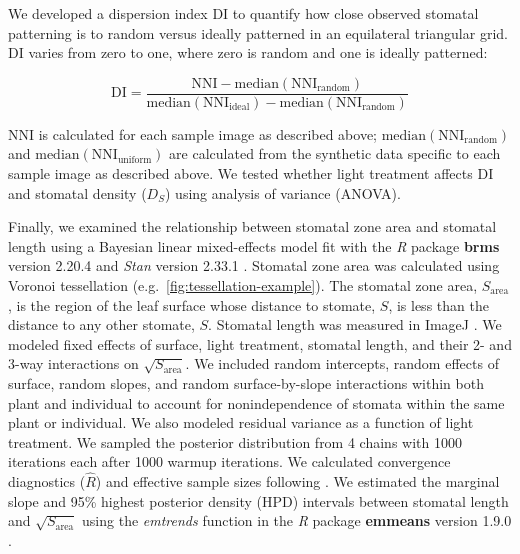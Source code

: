 \documentclass[webpdf,large,modern,unnumsec,namedate]{oup-authoring-template}
\begin{document}
We developed a dispersion index \(\mathrm{DI}\) to quantify how close
observed stomatal patterning is to random versus ideally patterned in an
equilateral triangular grid. \(\mathrm{DI}\) varies from zero to one,
where zero is random and one is ideally patterned:

\begin{equation}\label{eq:disp}
  \mathrm{DI} = \frac{\mathrm{NNI} - \text{median}(\mathrm{NNI_{random}})}{\text{median}(\mathrm{NNI_{ideal}}) - \text{median}(\mathrm{NNI_{random}})}
\end{equation}

\noindent \(\mathrm{NNI}\) is calculated for each sample image as
described above; \(\text{median}(\mathrm{NNI_{random}})\) and
\(\text{median}(\mathrm{NNI_{uniform}})\) are calculated from the
synthetic data specific to each sample image as described above. We
tested whether light treatment affects \(\mathrm{DI}\) and stomatal
density (\(D_S\)) using analysis of variance (ANOVA).

Finally, we examined the relationship between stomatal zone area and
stomatal length using a Bayesian linear mixed-effects model fit with the
\emph{R} package \textbf{brms} version 2.20.4
\citep{burkner_brms_2017, burkner_advanced_2018} and \emph{Stan} version
2.33.1 \citep{stan_development_team_stan_2023}. Stomatal zone area was
calculated using Voronoi tessellation
(e.g.~\autoref{fig:tessellation-example}). The stomatal zone area,
\(S_\text{area}\), is the region of the leaf surface whose distance to
stomate, \(S\), is less than the distance to any other stomate, \(S\).
Stomatal length was measured in ImageJ \citep{schneider_nih_2012}. We
modeled fixed effects of surface, light treatment, stomatal length, and
their 2- and 3-way interactions on \(\sqrt{S_\text{area}}\). We included
random intercepts, random effects of surface, random slopes, and random
surface-by-slope interactions within both plant and individual to
account for nonindependence of stomata within the same plant or
individual. We also modeled residual variance as a function of light
treatment. We sampled the posterior distribution from 4 chains with 1000
iterations each after 1000 warmup iterations. We calculated convergence
diagnostics (\(\hat{R}\)) and effective sample sizes following
\citet{vehtari_rank-normalization_2021}. We estimated the marginal slope
and 95\% highest posterior density (HPD) intervals between stomatal
length and \(\sqrt{S_\text{area}}\) using the \emph{emtrends} function
in the \emph{R} package \textbf{emmeans} version 1.9.0
\citep{lenth_emmeans_2023}.
\end{document}
